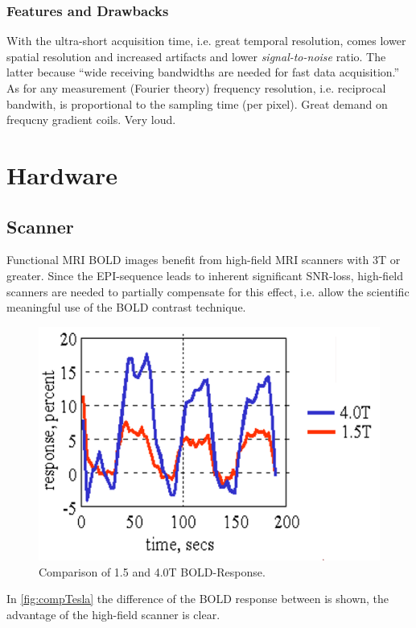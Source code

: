 \documentclass[a4paper]{scrartcl}
\begin{document}
\subsubsection{Features and Drawbacks}
With the ultra-short acquisition time, i.e. great temporal resolution, comes lower spatial resolution and increased artifacts and lower \textit{signal-to-noise} ratio.
The latter because \enquote{wide receiving bandwidths are needed for fast data acquisition.}\cite[1050]{delapaz} As for any measurement (Fourier theory) frequency resolution, i.e. reciprocal bandwith, is proportional to the sampling time (per pixel).
Great demand on frequcny gradient coils. Very loud.\\

\section{Hardware}
\label{sec:hardware}

\subsection{Scanner}
Functional MRI BOLD images benefit from high-field MRI scanners with 3T or greater.
Since the EPI-sequence leads to inherent significant SNR-loss, high-field scanners are needed to partially compensate for this effect, i.e. allow the scientific meaningful use of the BOLD contrast technique.
\begin{figure}[bh]
  \centering
  \includegraphics[width = .5\textwidth]{pictures/compTesla.png}
  \caption{Comparison of 1.5 and 4.0T BOLD-Response.\cite{turner}}
  \label{fig:compTesla}
\end{figure}
In \autoref{fig:compTesla} the difference of the BOLD response between is shown, the advantage of the high-field scanner is clear.
\end{document}
